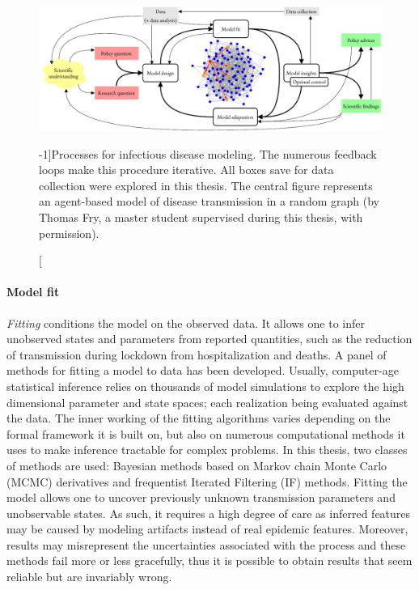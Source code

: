  \begin{figure}\centering
  \includegraphics{fig/modeling_cycle}
  \caption[Processes for infectious disease modeling][-1\baselineskip]{Processes for infectious disease modeling. The numerous feedback loops make this procedure iterative. All boxes save for data collection were explored in this thesis. The central figure represents an agent-based model of disease transmission in a random graph (by Thomas Fry, a master student supervised during this thesis, with permission).}\label{fig:modeling}
\end{figure}
\paragraph{Model fit} \textit{Fitting} conditions the model on the observed data. It allows one to infer unobserved states and parameters from reported quantities, such as the reduction of transmission during lockdown from hospitalization and deaths. A panel of methods for fitting a model to data has been developed. Usually, computer-age statistical inference relies on thousands of model simulations to explore the high dimensional parameter and state spaces; each realization being evaluated against the data. The inner working of the fitting algorithms varies depending on the formal framework it is built on, but also on numerous computational methods it uses to make inference tractable for complex problems. In this thesis, two classes of methods are used: Bayesian methods based on Markov chain Monte Carlo (MCMC) derivatives and frequentist Iterated Filtering (IF) methods. Fitting the model allows one to uncover previously unknown transmission parameters and unobservable states. As such, it requires a high degree of care as inferred features may be caused by modeling artifacts instead of real epidemic features. Moreover, results may misrepresent the uncertainties associated with the process and these methods fail more or less gracefully, thus it is possible to obtain results that seem reliable but are invariably wrong.
 
